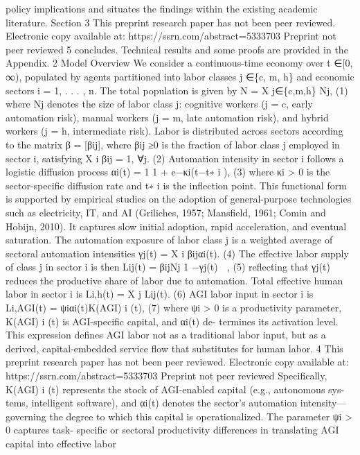 policy implications and situates the findings within the existing academic literature. Section
3
This preprint research paper has not been peer reviewed. Electronic copy available at: https://ssrn.com/abstract=5333703
Preprint not peer reviewed
5 concludes. Technical results and some proofs are provided in the Appendix.
2
Model Overview
We consider a continuous-time economy over t ∈[0, ∞), populated by agents partitioned
into labor classes j ∈\{c, m, h\} and economic sectors i = 1, . . . , n. The total population is
given by
N =
X
j∈\{c,m,h\}
Nj,
(1)
where Nj denotes the size of labor class j: cognitive workers (j = c, early automation risk),
manual workers (j = m, late automation risk), and hybrid workers (j = h, intermediate
risk). Labor is distributed across sectors according to the matrix β = [βij], where βij ≥0 is
the fraction of labor class j employed in sector i, satisfying
X
i
βij = 1,
∀j.
(2)
Automation intensity in sector i follows a logistic diffusion process
αi(t) =
1
1 + e−κi(t−t∗
i ),
(3)
where κi > 0 is the sector-specific diffusion rate and t∗
i is the inflection point. This functional
form is supported by empirical studies on the adoption of general-purpose technologies such
as electricity, IT, and AI (Griliches, 1957; Mansfield, 1961; Comin and Hobijn, 2010). It
captures slow initial adoption, rapid acceleration, and eventual saturation. The automation
exposure of labor class j is a weighted average of sectoral automation intensities
γj(t) =
X
i
βijαi(t).
(4)
The effective labor supply of class j in sector i is then
Lij(t) = βijNj
 1 −γj(t)

,
(5)
reflecting that γj(t) reduces the productive share of labor due to automation. Total effective
human labor in sector i is
Li,h(t) =
X
j
Lij(t).
(6)
AGI labor input in sector i is
Li,AGI(t) = ψiαi(t)K(AGI)
i
(t),
(7)
where ψi > 0 is a productivity parameter, K(AGI)
i
(t) is AGI-specific capital, and αi(t) de-
termines its activation level. This expression defines AGI labor not as a traditional labor
input, but as a derived, capital-embedded service flow that substitutes for human labor.
4
This preprint research paper has not been peer reviewed. Electronic copy available at: https://ssrn.com/abstract=5333703
Preprint not peer reviewed
Specifically, K(AGI)
i
(t) represents the stock of AGI-enabled capital (e.g., autonomous sys-
tems, intelligent software), and αi(t) denotes the sector’s automation intensity—governing
the degree to which this capital is operationalized. The parameter ψi > 0 captures task-
specific or sectoral productivity differences in translating AGI capital into effective labor
